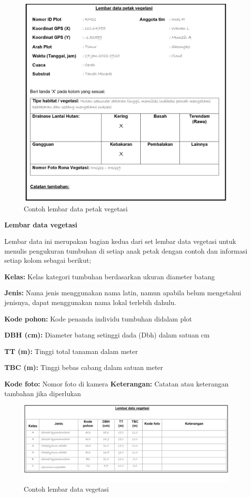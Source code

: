 \documentclass[
]{book}
\begin{document}
\begin{figure}

{\centering \includegraphics[width=1\linewidth]{images/ldv_ip} 

}

\caption{Contoh lembar data petak vegetasi}\label{fig:ldvip}
\end{figure}

\textbf{Lembar data vegetasi}

Lembar data ini merupakan bagian kedua dari set lembar data vegetasi untuk menulis pengukuran tumbuhan di setiap anak petak dengan contoh dan informasi setiap kolom sebagai berikut;

\textbf{Kelas:} Kelas kategori tumbuhan berdasarkan ukuran diameter batang

\textbf{Jenis:} Nama jenis menggunakan nama latin, namun apabila belum mengetahui jenisnya, dapat menggunakan nama lokal terlebih dahulu.

\textbf{Kode pohon:} Kode penanda individu tumbuhan didalam plot

\textbf{DBH (cm):} Diameter batang setinggi dada (Dbh) dalam satuan cm

\textbf{TT (m):} Tinggi total tanaman dalam meter

\textbf{TBC (m):} Tinggi bebas cabang dalam satuan meter

\textbf{Kode foto:} Nomor foto di kamera
\textbf{Keterangan:} Catatan atau keterangan tambahan jika diperlukan

\begin{figure}

{\centering \includegraphics[width=1\linewidth]{images/ldv_m} 

}

\caption{Contoh lembar data vegetasi}\label{fig:ldvm}
\end{figure}
\end{document}
